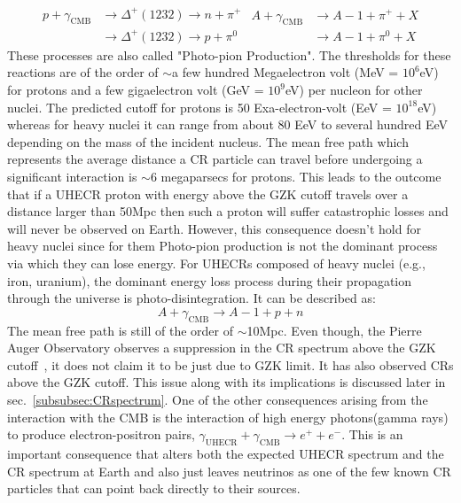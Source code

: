 \begin{equation}\label{eq:GZK}
  \begin{split}
    p + \gamma_{\text{CMB}} &\longrightarrow \Delta^+(1232 ) \longrightarrow n+\pi^+ \\ 
                     &\longrightarrow \Delta^+(1232 ) \longrightarrow p+\pi^0
  \end{split} 
  \begin{split}
    A + \gamma_{\text{CMB}} &\longrightarrow A-1 + \pi^+ + X \\ 
                     &\longrightarrow A-1 + \pi^0 + X
  \end{split} 
\end{equation}
These processes are also called "Photo-pion Production". The thresholds for these reactions are of the order of $\sim$a few hundred Megaelectron volt (MeV = $10^6$eV) for protons and a few gigaelectron volt (GeV = $10^9$eV)  per nucleon for other nuclei. The predicted cutoff for protons is 50 Exa-electron-volt (EeV = $10^{18}$eV) whereas for heavy nuclei it can range from about 80 EeV to several hundred EeV depending on the mass of the incident nucleus. The mean free path which represents the average distance a \gls{CR} particle can travel before undergoing a significant interaction is $\sim$6 megaparsecs for protons. This leads to the outcome that if a \gls{UHECR} proton with energy above the GZK cutoff travels over a distance larger than 50Mpc then such a proton will suffer catastrophic losses and will never be observed on Earth. However, this consequence doesn't hold for heavy nuclei since for them Photo-pion production is not the dominant process via which they can lose energy. For \glspl{UHECR} composed of heavy nuclei (e.g., iron, uranium), the dominant energy loss process during their propagation through the universe is photo-disintegration. It can be described as:
\begin{equation}\label{eq:Pdisinteg}
    A + \gamma_{\text{CMB}} \longrightarrow A-1 + p + n  
\end{equation}
The mean free path is still of the order of $\sim$10Mpc.
Even though, the Pierre Auger Observatory observes a suppression in the \gls{CR} spectrum above the \gls{GZK} cutoff~\cite{KAMPERT2014318}, it does not claim it to be just due to GZK limit. It has also observed \glspl{CR} above the \gls*{GZK} cutoff. This issue along with its implications is discussed later in sec.~\ref{subsubsec:CRspectrum}. One of the other consequences arising from the interaction with the CMB is the interaction of high energy photons(gamma rays) to produce electron-positron pairs, $\gamma_{\text{UHECR}} + \gamma_{\text{CMB}} \longrightarrow e^+ + e^- $. This is an important consequence that alters both the expected \gls{UHECR} spectrum and the CR spectrum at Earth and also just leaves neutrinos as one of the few known \gls{CR} particles that can point back directly to their sources.


